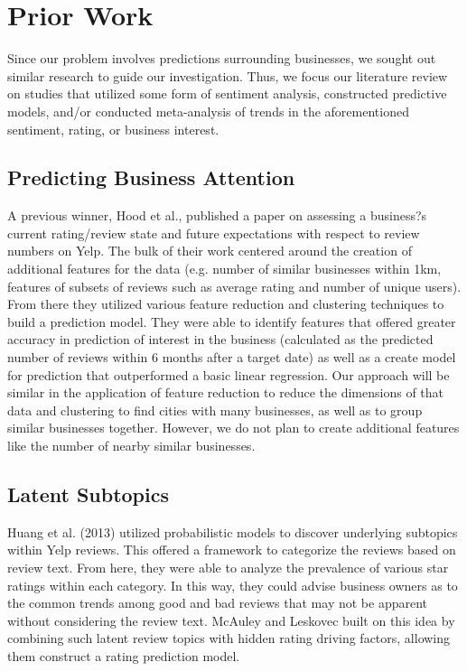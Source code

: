 \section{Prior Work}

Since our problem involves predictions surrounding businesses, we sought out similar research to guide our investigation. Thus, we focus our literature review on studies that utilized some form of sentiment analysis, constructed predictive models, and/or conducted meta-analysis of trends in the aforementioned sentiment, rating, or business interest.

\subsection{Predicting Business Attention}

A previous winner, Hood et al., published a paper on assessing a business?s current rating/review state and future expectations with respect to review numbers on Yelp. The bulk of their work centered around the creation of additional features for the data (e.g. number of similar businesses within 1km, features of subsets of reviews such as average rating and number of unique users). From there they utilized various feature reduction and clustering techniques to build a prediction model. They were able to identify features that offered greater accuracy in prediction of interest in the business (calculated as the predicted number of reviews within 6 months after a target date) as well as a create model for prediction that outperformed a basic linear regression. Our approach will be similar in the application of feature reduction to reduce the dimensions of that data and clustering to find cities with many businesses, as well as to group similar businesses together. However, we do not plan to create additional features like the number of nearby similar businesses.

\subsection{Latent Subtopics}

Huang et al. (2013) utilized probabilistic models to discover underlying subtopics within Yelp reviews. This offered a framework to categorize the reviews based on review text. From here, they were able to analyze the prevalence of various star ratings within each category. In this way, they could advise business owners as to the common trends among good and bad reviews that may not be apparent without considering the review text. McAuley and Leskovec built on this idea by combining such latent review topics with hidden rating driving factors, allowing them construct a rating prediction model.

